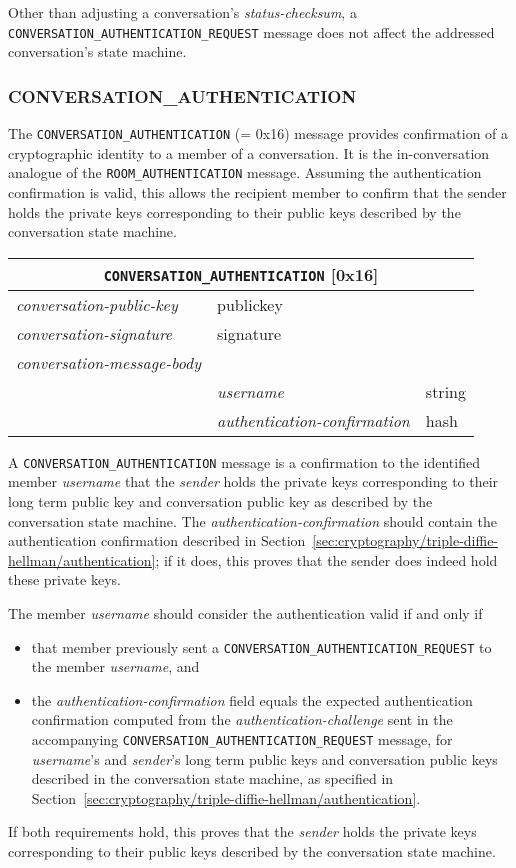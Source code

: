 \documentclass{article}
\def\message#1{\texttt{#1}}
\def\field#1{\textit{#1}}
\def\smfield#1{\textsl{#1}}
\def\type#1{\textsf{#1}}
\newenvironment{conversationmessage}[2]{
\newcommand{\messagefield}[2]{
& \field{##1} & \type{##2} \\
\hline
}
\hspace{2em minus 2em}\begin{tabular}{|l|l|l|}
\hline
\multicolumn{3}{|c|}{\message{#1} [#2]} \\
\hline
\hline
\field{conversation-public-key} & \multicolumn{2}{l|}{\type{publickey}} \\
\hline
\field{conversation-signature} & \multicolumn{2}{l|}{\type{signature}} \\
\hline
\field{conversation-message-body} & \multicolumn{2}{l|}{} \\
\hline
}{
\end{tabular}
}
\begin{document}
Other than adjusting a conversation's \smfield{status-checksum}, a \message{CONVERSATION\_AUTHENTICATION\_REQUEST} message does not affect the addressed conversation's state machine.


\subsubsection{CONVERSATION\_AUTHENTICATION}
\label{sec:messages/conversation-authentication}

The \message{CONVERSATION\_AUTHENTICATION} (= 0x16) message provides confirmation of a cryptographic identity to a member of a conversation.
It is the in-conversation analogue of the \message{ROOM\_AUTHENTICATION} message.
Assuming the authentication confirmation is valid, this allows the recipient member to confirm that the sender holds the private keys corresponding to their public keys described by the conversation state machine.

\begin{conversationmessage}{CONVERSATION\_AUTHENTICATION}{0x16}
\messagefield{username}{string}
\messagefield{authentication-confirmation}{hash}
\end{conversationmessage}

A \message{CONVERSATION\_AUTHENTICATION} message is a confirmation to the identified member \field{username} that the \field{sender} holds the private keys corresponding to their long term public key and conversation public key as described by the conversation state machine.
The \emph{authentication-confirmation} should contain the authentication confirmation described in Section~\ref{sec:cryptography/triple-diffie-hellman/authentication}; if it does, this proves that the sender does indeed hold these private keys.

The member \field{username} should consider the authentication valid if and only if
\begin{itemize}
\item that member previously sent a \message{CONVERSATION\_AUTHENTICATION\_REQUEST} to the member \emph{username}, and
\item the \field{authentication-confirmation} field equals the expected authentication confirmation computed from the \field{authentication-challenge} sent in the accompanying \message{CONVERSATION\_AUTHENTICATION\_REQUEST} message, for \field{username}'s and \field{sender}'s long term public keys and conversation public keys described in the conversation state machine, as specified in Section~\ref{sec:cryptography/triple-diffie-hellman/authentication}.
\end{itemize}
If both requirements hold, this proves that the \field{sender} holds the private keys corresponding to their public keys described by the conversation state machine.
\end{document}
